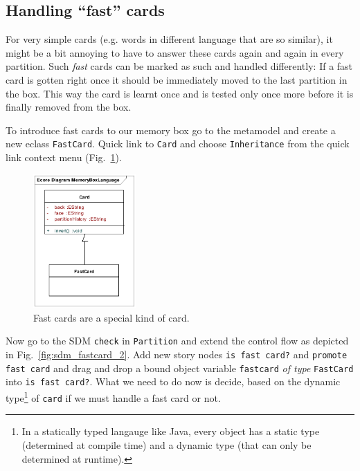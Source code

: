 \subsection{Handling ``fast'' cards}
	
For very simple cards (e.g. words in different language that are so similar), it
might be a bit annoying to have to answer these cards again and again in every
partition.  Such \emph{fast} cards can be marked as such and handled
differently:  If a fast card is gotten right once it should be immediately moved
to the last partition in the box.  This way the card is learnt once and is
tested only once more before it is finally removed from the box.

To introduce fast cards to our memory box go to the metamodel and create a new
eclass \texttt{FastCard}.  Quick link to \texttt{Card} and choose
\texttt{Inheritance} from the quick link context menu
(Fig.~\ref{fig:sdm_fastcard_1}). 

\begin{figure}[htp]
\begin{center}
  \includegraphics[width=0.35\textwidth]{pics/sdmBilder/bindings/fastcard}
  \caption{Fast cards are a special kind of card.}  
  \label{fig:sdm_fastcard_1}
\end{center}
\end{figure}

Now go to the SDM \texttt{check} in \texttt{Partition} and extend the control
flow as depicted in Fig.~\ref{fig:sdm_fastcard_2}.  Add new story nodes
\texttt{is fast card?} and \texttt{promote fast card} and drag and drop a bound
object variable \texttt{fastcard} \emph{of type} \texttt{FastCard} into
\texttt{is fast card?}.  What we need to do now is decide, based on the dynamic
type\footnote{In a statically typed langauge like Java, every object has a
static type (determined at compile time) and a dynamic type (that can only be
determined at runtime).} of \texttt{card} if we must handle a fast card or not.

